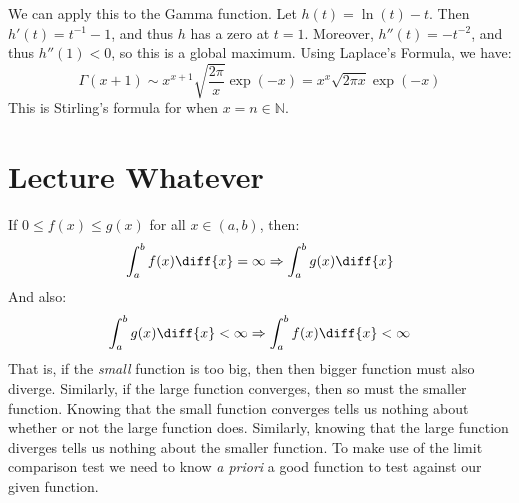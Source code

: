         We can apply this to the Gamma function. Let
        $h(t)=\ln(t)-t$. Then $h'(t)=t^{\minus{1}}-1$, and thus $h$
        has a zero at $t=1$. Moreover, $h''(t)=\minus{t}^{\minus{2}}$,
        and thus $h''(1)<0$, so this is a global maximum.
        Using Laplace's Formula, we have:
        \begin{equation}
            \Gamma(x+1)\sim{x}^{x+1}
            \sqrt{\frac{2\pi}{x}}\exp(\minus{x})
            =x^{x}\sqrt{2\pi{x}}\exp(\minus{x})
        \end{equation}
        This is Stirling's formula for when $x=n\in\mathbb{N}$.
    \section{Lecture Whatever}
        If $0\leq{f}(x)\leq{g}(x)$ for all $x\in(a,b)$, then:
        \begin{equation}
            \int_{a}^{b}f(x)\diff{x}=\infty
            \Rightarrow\int_{a}^{b}g(x)\diff{x}
        \end{equation}
        And also:
        \begin{equation}
            \int_{a}^{b}g(x)\diff{x}<\infty
            \Rightarrow\int_{a}^{b}f(x)\diff{x}<\infty
        \end{equation}
        That is, if the \textit{small} function is too big,
        then then bigger function must also diverge. Similarly,
        if the large function converges, then so must the smaller
        function. Knowing that the small function converges tells
        us nothing about whether or not the large function does.
        Similarly, knowing that the large function diverges tells
        us nothing about the smaller function. To make use of the
        limit comparison test we need to know \textit{a priori} a
        good function to test against our given function.
